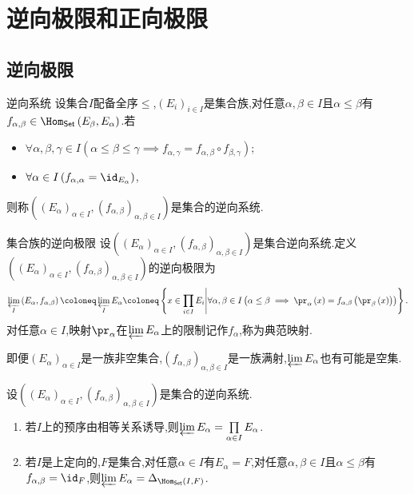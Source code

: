 \chapter{逆向极限和正向极限}

\section{逆向极限}

\begin{definition}{逆向系统}{}
	设集合$I$配备全序$\leq$,$\left(E_{i}\right)_{i\in I}$是集合族,对任意$\alpha,\beta\in I$且$\alpha\leq\beta$有$f_{\alpha,\beta}\in\Hom_{\mathsf{Set}}\left(E_{\beta},E_{\alpha}\right)$.若
	\begin{itemize}
		\item $\forall\alpha,\beta,\gamma\in I\left(\alpha\leq\beta\leq\gamma\implies f_{\alpha,\gamma}=f_{\alpha,\beta}\circ f_{\beta,\gamma}\right)$;
		\item $\forall\alpha\in I\left(f_{\alpha,\alpha}=\id_{E_{\alpha}}\right)$,
	\end{itemize}
	则称$\left(\left(E_{\alpha}\right)_{\alpha\in I},\left(f_{\alpha,\beta}\right)_{\alpha,\beta\in I}\right)$是集合的逆向系统.
\end{definition}

\begin{definition}{集合族的逆向极限}{}
	设$\left(\left(E_{\alpha}\right)_{\alpha\in I},\left(f_{\alpha,\beta}\right)_{\alpha,\beta\in I}\right)$是集合逆向系统.定义$\left(\left(E_{\alpha}\right)_{\alpha\in I},\left(f_{\alpha,\beta}\right)_{\alpha,\beta\in I}\right)$的逆向极限为
	\begin{align*}
		\varprojlim\limits_{I}\left(E_{\alpha},f_{\alpha,\beta}\right)\coloneq\varprojlim\limits_{I}E_{\alpha}\coloneq\left\{x\in\prod\limits_{i\in I}E_{i}\middle|\forall\alpha,\beta\in I\left(\alpha\leq\beta\implies \pr_{\alpha}\left(x\right)=f_{\alpha,\beta}\left(\pr_{\beta}\left(x\right)\right)\right)\right\}.
	\end{align*}
	对任意$\alpha\in I$,映射$\pr_{\alpha}$在$\varprojlim E_{\alpha}$上的限制记作$f_{\alpha}$,称为典范映射.
\end{definition}

\begin{remark}{}{}
	即便$\left(E_{\alpha}\right)_{\alpha\in I}$是一族非空集合,$\left(f_{\alpha,\beta}\right)_{\alpha,\beta\in I}$是一族满射,$\varprojlim E_{\alpha}$也有可能是空集.
\end{remark}

\begin{example}{}{}
	设$\left(\left(E_{\alpha}\right)_{\alpha\in I},\left(f_{\alpha,\beta}\right)_{\alpha,\beta\in I}\right)$是集合的逆向系统.
	\begin{enumerate}
		\item 若$I$上的预序由相等关系诱导,则$\varprojlim E_{\alpha}=\prod\limits_{\alpha\in I}E_{\alpha}$.
		\item 若$I$是上定向的,$F$是集合,对任意$\alpha\in I$有$E_{\alpha}=F$,对任意$\alpha,\beta\in I$且$\alpha\leq\beta$有$f_{\alpha,\beta}=\id_{F}$,则$\varprojlim E_{\alpha}=\Delta_{\Hom_{\mathsf{Set}}\left(I,F\right)}$.
	\end{enumerate}
\end{example}


